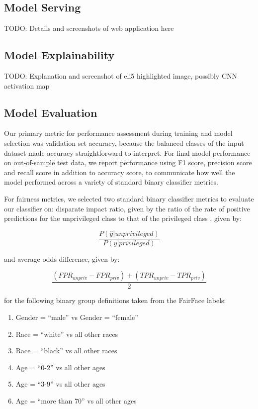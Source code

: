 \documentclass[11pt, letterpaper]{article}
\providecommand{\tightlist}{%
  \setlength{\itemsep}{0pt}\setlength{\parskip}{0pt}
}
\begin{document}
\begin{multicols}{2}
  \subsection{Model Serving}

  TODO: Details and screenshots of web application here

  \subsection{Model Explainability}

  TODO: Explanation and screenshot of eli5 highlighted image, possibly CNN
  activation map

  \subsection{Model Evaluation}

  Our primary metric for performance assessment during training and
  model selection was validation set accuracy, because the balanced
  classes of the input dataset made accuracy straightforward to
  interpret. For final model performance on out-of-sample test data,
  we report performance using F1 score, precision score and recall
  score in addition to accuracy score, to communicate how well the
  model performed across a variety of standard binary classifier
  metrics.

  For fairness metrics, we selected two standard binary classifier
  metrics to evaluate our classifier on: disparate impact ratio, given
  by the ratio of the rate of positive predictions for the
  unprivileged class to that of the privileged class
  \cite{fairMLHealth}, given by:

  $$\frac{P(\hat{y}|unprivileged)}{P(\hat{y}|privileged)}$$

  and average odds difference, given by:

  $$\frac{(FPR_{unpriv} - FPR_{priv}) + (TPR_{unpriv} - TPR_{priv})}{2}$$

  for the following binary group definitions taken from the FairFace
  labels:

  \begin{enumerate}
    \tightlist
  \item Gender = ``male'' vs Gender = ``female''
  \item Race = ``white'' vs all other races
  \item Race = ``black'' vs all other races
  \item Age = ``0-2'' vs all other ages
  \item Age = ``3-9'' vs all other ages
  \item Age = ``more than 70'' vs all other ages
  \end{enumerate}


\end{multicols}
\end{document}
